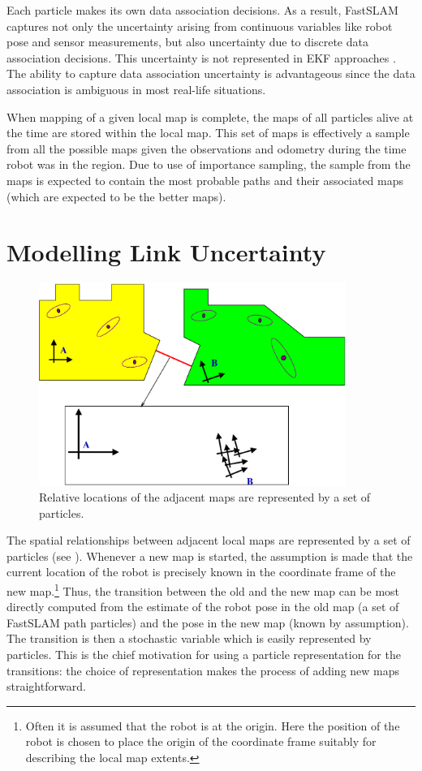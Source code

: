 Each particle makes its own data association decisions. As a result,
FastSLAM captures not only the uncertainty arising from continuous
variables like robot pose and sensor measurements, but also
uncertainty due to discrete data association decisions. This
uncertainty is not represented in EKF approaches \cite{ekf_slam}.  The
ability to capture data association uncertainty is advantageous since
the data association is ambiguous in most real-life situations.

When mapping of a given local map is complete, the maps of all
particles alive at the time are stored within the local map. This set
of maps is effectively a sample from all the possible maps given the
observations and odometry during the time robot was in the region.
Due to use of importance sampling, the sample from the maps is
expected to contain the most probable paths and their associated maps
(which are expected to be the better maps).

\section{Modelling Link Uncertainty}
\label{sec:link}

\begin{figure}
\begin{center}
\includegraphics[width=10cm]{Pics/fig_transition_model}
\end{center}
\caption[Modeling transition distribution]
{Relative locations of the adjacent maps are represented by a
  set of particles.}
\label{fig:transition_model}
\end{figure}

The spatial relationships between adjacent local maps are represented
by a set of particles (see ).
Whenever a new map is started, the assumption is made that the current
location of the robot is precisely known in the coordinate frame of
the new map.\footnote{Often it is assumed that the robot is at the
  origin.  Here the position of the robot is chosen to place the
  origin of the coordinate frame suitably for describing the local map
  extents.} Thus, the transition between the old and the new map can
be most directly computed from the estimate of the robot pose in the
old map (a set of FastSLAM path particles) and the pose in the new map
(known by assumption). The transition is then a stochastic variable
which is easily represented by particles. This is the chief motivation
for using a particle representation for the transitions: the choice of
representation makes the process of adding new maps straightforward.

